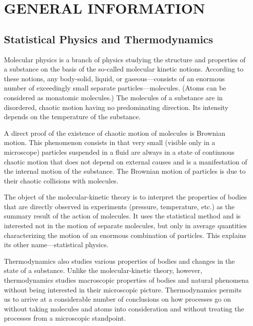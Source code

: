 

\chapter{GENERAL INFORMATION}\label{chap:10}

\section{Statistical Physics and Thermodynamics}\label{sec:10_1}

Molecular physics is a branch of physics studying the structure and properties of a substance on the basis of the so-called molecular kinetic notions. According to these notions, any body-solid, liquid, or gaseous---consists of an enormous number of exceedingly small separate particles---molecules. (Atoms can be considered as monatomic molecules.) The molecules of a substance are in disordered, chaotic motion having no predominating direction. Its intensity depends on the temperature of the substance.

A direct proof of the existence of chaotic motion of molecules is Brownian motion. This phenomenon consists in that very small (visible only in a microscope) particles suspended in a fluid are always in a state of continuous chaotic motion that does not depend on external causes and is a manifestation of the internal motion of the substance. The Brownian motion of particles is due to their chaotic collisions with molecules.

The object of the molecular-kinetic theory is to interpret the properties of bodies that are directly observed in experiments (pressure, temperature, etc.) as the summary result of the action of molecules. It uses the statistical method and is interested not in the motion of separate molecules, but only in average quantities characterizing the motion of an enormous combination of particles. This explains its other name---statistical physics.

Thermodynamics also studies various properties of bodies and changes in the state of a substance. Unlike the molecular-kinetic theory, however, thermodynamics studies macroscopic properties of bodies and natural phenomena without being interested in their microscopic picture. Thermodynamics permits us to arrive at a considerable number of conclusions on how processes go on without taking molecules and atoms into consideration and without treating the processes from a microscopic standpoint.

